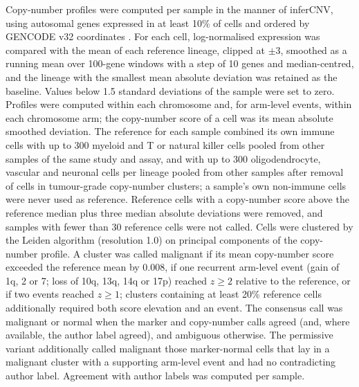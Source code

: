 \documentclass[11pt,a4paper]{article}
\begin{document}
Copy-number profiles were computed per sample in the manner of inferCNV, using autosomal genes expressed in at least
10\% of cells and ordered by GENCODE v32 coordinates \citep{frankish2023gencode}. For each cell, log-normalised expression
was compared with the mean of each reference lineage, clipped at $\pm 3$, smoothed as a running mean over 100-gene windows
with a step of 10 genes and median-centred, and the lineage with the smallest mean absolute deviation was retained as the
baseline. Values below 1.5 standard deviations of the sample were set to zero. Profiles were computed within each
chromosome and, for arm-level events, within each chromosome arm; the copy-number score of a cell was its mean absolute
smoothed deviation. The reference for each sample combined its own immune cells with up to 300 myeloid and T or
natural killer cells pooled from other samples of the same study and assay, and with up to 300 oligodendrocyte, vascular and
neuronal cells per lineage pooled from other samples after removal of cells in tumour-grade copy-number clusters; a sample's
own non-immune cells were never used as reference. Reference cells with a copy-number score above the reference median plus
three median absolute deviations were removed, and samples with fewer than 30 reference cells were not called. Cells were clustered by the Leiden algorithm (resolution 1.0) on principal components of the copy-number profile.
A cluster was called malignant if its mean copy-number score exceeded the reference mean by 0.008, if one recurrent arm-level
event (gain of 1q, 2 or 7; loss of 10q, 13q, 14q or 17p) reached $z \geq 2$ relative to the reference, or if two events
reached $z \geq 1$; clusters containing at least 20\% reference cells additionally required both score elevation and an
event. The consensus call was malignant or normal when the marker and copy-number calls agreed (and, where available, the
author label agreed), and ambiguous otherwise. The permissive variant additionally called malignant those marker-normal
cells that lay in a malignant cluster with a supporting arm-level event and had no contradicting author label. Agreement
with author labels was computed per sample.
\end{document}
